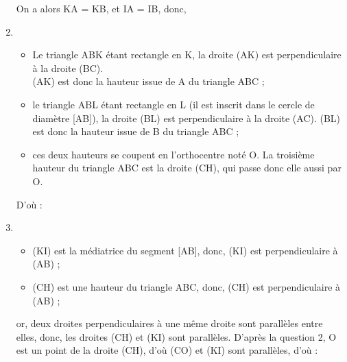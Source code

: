 \begin{enumerate}
      On a alors KA = KB, et IA = IB, donc, 
      \item
      \begin{itemize}
          \item Le triangle ABK étant rectangle en K, la droite (AK) est perpendiculaire à la droite (BC). \\
          (AK) est donc la hauteur issue de A du triangle ABC ;
          \item le triangle ABL étant rectangle en L (il est inscrit dans le cercle de diamètre [AB]), la droite (BL) est perpendiculaire à la droite (AC). (BL) est donc la hauteur issue de B du triangle ABC ;
          \item ces deux hauteurs se coupent en l'orthocentre noté O. La troisième hauteur du triangle ABC est la droite (CH), qui passe donc elle aussi par O.
      \end{itemize}
      D'où : 
      \item
      \begin{itemize}
         \item (KI) est la médiatrice du segment [AB], donc, (KI) est perpendiculaire à (AB) ;
         \item (CH) est une hauteur du triangle ABC, donc, (CH) est perpendiculaire à (AB) ;
      \end{itemize}
      or, deux droites perpendiculaires à une même droite sont parallèles entre elles, donc, les droites (CH) et (KI) sont parallèles. D'après la question 2, O est un point de la droite (CH), d'où  (CO) et (KI) sont parallèles, d'où : \\
   \end{enumerate}
